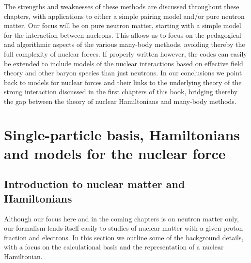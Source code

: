 The strengths and weaknesses of these methods are discussed throughout these chapters, with applications to either a simple pairing model
and/or pure neutron matter. Our focus will be on pure neutron matter, starting with a simple model for the interaction
between nucleons. This allows us to focus on the pedagogical and algorithmic aspects of the various many-body methods, avoiding thereby the  full complexity of nuclear forces.
If properly written however, the codes can easily be extended to include models of the nuclear interactions based on effective field theory \cite{eft} and other baryon species than just neutrons. In our conclusions we point  back to models for nuclear forces and their links to the underlying theory of the strong interaction discussed in the first chapters of this book, bridging thereby the gap between the theory of nuclear Hamiltonians and many-body methods. 


\section{Single-particle basis, Hamiltonians and models for the nuclear force}

\subsection{Introduction to nuclear matter and Hamiltonians}

Although our focus here and in the coming chapters is on neutron matter only, 
our formalism lends itself easily to studies of nuclear  matter 
with a given proton fraction and electrons. In this section we outline some of the background details, with a focus on the calculational basis
and the representation of a nuclear Hamiltonian. 

